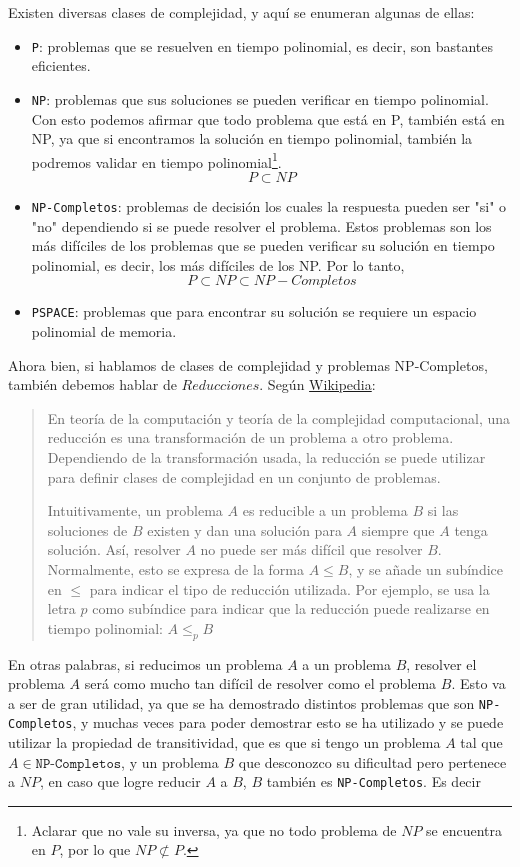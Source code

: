Existen diversas clases de complejidad, y aquí se enumeran algunas de ellas:
\begin{itemize}
    \item \texttt{P}: problemas que se resuelven en tiempo polinomial, es decir, son bastantes eficientes.
    \item \texttt{NP}: problemas que sus soluciones se pueden verificar en tiempo polinomial. Con esto podemos afirmar que todo problema que está en P, también está en NP, ya que si encontramos la solución en tiempo polinomial, también la podremos validar en tiempo polinomial\footnote{Aclarar que no vale su inversa, ya que no todo problema de $NP$ se encuentra en $P$, por lo que $NP \not\subset  P$.}.
	\[ P \subset NP\]
    \item \texttt{NP-Completos}: problemas de decisión los cuales la respuesta pueden ser "si" o "no" dependiendo si se puede resolver el problema. Estos problemas son los más difíciles de los problemas que se pueden verificar su solución en tiempo polinomial, es decir, los más difíciles de los NP.
	Por lo tanto,
	\[ P \subset NP \subset NP-Completos\]
    \item \texttt{PSPACE}: problemas que para encontrar su solución se requiere un espacio polinomial de memoria.
\end{itemize}
Ahora bien, si hablamos de clases de complejidad y problemas NP-Completos, también debemos hablar de $Reducciones$. Según \href{https://es.wikipedia.org/wiki/Reducci%C3%B3n_(complejidad)}{Wikipedia}:
\begin{quote}
	En teoría de la computación y teoría de la complejidad computacional, una reducción es una transformación de un problema a otro problema. Dependiendo de la transformación usada, la reducción se puede utilizar para definir clases de complejidad en un conjunto de problemas.

	Intuitivamente, un problema $A$ es reducible a un problema $B$ si las soluciones de $B$ existen y dan una solución para $A$ siempre que $A$ tenga solución. Así, resolver $A$ no puede ser más difícil que resolver $B$. Normalmente, esto se expresa de la forma $A \leq B$, y se añade un subíndice en $\le$ para indicar el tipo de reducción utilizada. Por ejemplo, se usa la letra $p$ como subíndice para indicar que la reducción puede realizarse en tiempo polinomial: $A \leq _p B$
\end{quote}

En otras palabras, si reducimos un problema $A$ a un problema $B$, resolver el problema $A$ será como mucho tan difícil de resolver como el problema $B$. Esto va a ser de gran utilidad, ya que se ha demostrado distintos problemas que son \texttt{NP-Completos}, y muchas veces para poder demostrar esto se ha utilizado y se puede utilizar la propiedad de transitividad, que es que si tengo un problema $A$ tal que $A \in \texttt{NP-Completos}$, y un problema $B$ que desconozco su dificultad pero pertenece a $NP$, en caso que logre reducir $A$ a $B$, $B$ también es \texttt{NP-Completos}. Es decir

